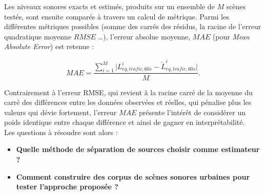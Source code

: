 Les niveaux sonores exacts et estimés, produits sur un ensemble de $M$ scènes testés, sont ensuite comparés à travers un calcul de métrique. Parmi les différentes métriques possibles (somme des carrés des résidus, la racine de l'erreur quadratique moyenne $RMSE$ \dots), l'erreur absolue moyenne, $MAE$ (pour \textit{Mean Absolute Error}) est retenue :

\begin{equation}
MAE = \frac{\sum_{i = 1}^{M} \vert L_{eq, trafic, 60s}^i - \tilde{L}_{eq, trafic, 60s}^i \vert}{M}.
\end{equation}

Contrairement à l'erreur RMSE, qui revient à la racine carré de la moyenne du carré des différences entre les données observées et réelles, qui pénalise plus les valeurs qui dévie fortement, l'erreur $MAE$ présente l'intérêt de considérer un poids identique entre chaque différence et ainsi de gagner en interprétabilité.\\

Les questions à résoudre sont alors :
\begin{itemize}
\item \textbf{Quelle méthode de séparation de sources choisir comme estimateur ?}
\item \textbf{Comment construire des corpus de scènes sonores urbaines pour tester l'approche proposée ?}
\end{itemize}

%

%
%
%
